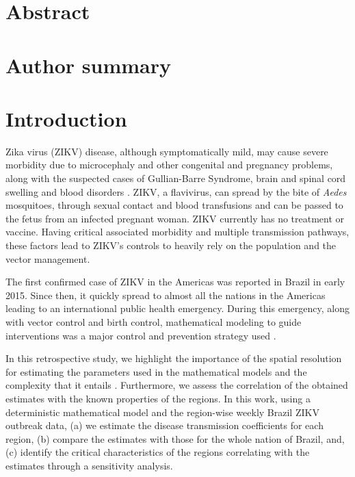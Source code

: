 \documentclass[10pt,letterpaper]{article}
\begin{document}
\section*{Abstract}



\section*{Author summary}

\linenumbers

    


\section*{Introduction}
Zika virus (ZIKV) disease, although symptomatically mild, may cause severe morbidity due to microcephaly and other congenital and pregnancy problems, along with the suspected cases of Gullian-Barre Syndrome, brain and spinal cord swelling and blood disorders \cite{paixao2016history,da2017neurologic}. ZIKV, a flavivirus, can spread by the bite of \textit{Aedes} mosquitoes, through sexual contact and blood transfusions and can be passed to the fetus from an infected pregnant woman. ZIKV currently has no treatment or vaccine. Having critical associated morbidity and multiple transmission pathways, these factors lead to ZIKV's controls to heavily rely on the population and the vector management.

The first confirmed case of ZIKV in the Americas was reported in Brazil in early 2015. Since then, it quickly spread to almost all the nations in the Americas leading to an international public health emergency. During this emergency, along with vector control and birth control, mathematical modeling to guide interventions was a major control and prevention strategy used \cite{lowe2018zika}.

In this retrospective study, we highlight the importance of the spatial resolution for estimating the parameters used in the mathematical models and the complexity that it entails \cite{thomas2016quantifying}. Furthermore, we assess the correlation of the obtained estimates with the known properties of the regions. In this work, using a deterministic mathematical model and the region-wise weekly Brazil ZIKV outbreak data, (a) we estimate the disease transmission coefficients for each region, (b) compare the estimates with those for the whole nation of Brazil, and, (c) identify the critical characteristics of the regions correlating with the estimates through a sensitivity analysis. 
\end{document}
